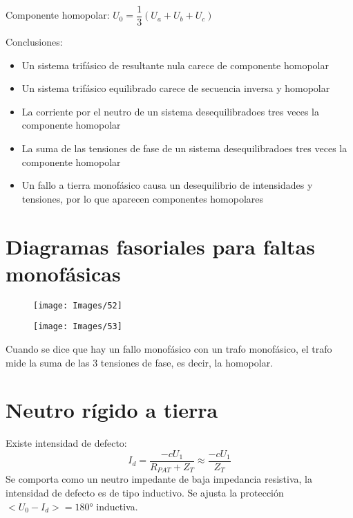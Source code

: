 Componente homopolar:
$U_0=\dfrac{1}{3}\left(U_a+U_b+U_c\right)$

Conclusiones:
\begin{itemize}
	\item Un sistema trifásico de resultante nula carece de componente homopolar
	\item Un sistema trifásico equilibrado carece de secuencia inversa y homopolar
	\item La corriente por el neutro de un sistema desequilibradoes tres veces la componente homopolar
	\item La suma de las tensiones de fase de un sistema desequilibradoes tres veces la componente homopolar
	\item Un fallo a tierra monofásico causa un desequilibrio de intensidades y tensiones, por lo que aparecen componentes homopolares
\end{itemize}
\section{Diagramas fasoriales para faltas monofásicas}
\begin{figure}[H]
	\centering
	\texttt{[image: Images/52]}
	\label{fig:52}
\end{figure}
\begin{figure}[H]
	\centering
	\texttt{[image: Images/53]}
	\label{fig:53}
\end{figure}
Cuando se dice que hay un fallo monofásico con un trafo monofásico, el trafo mide la suma de las 3 tensiones de fase, es decir, la homopolar.
\section{Neutro rígido a tierra}
Existe intensidad de defecto:
\begin{equation}
	I_d=\dfrac{-cU_1}{R_{PAT}+Z_T}\approx\dfrac{-cU_1}{Z_T}
\end{equation}
Se comporta como un neutro impedante de baja impedancia resistiva, la intensidad de defecto es de tipo inductivo. Se ajusta la protección $<U_0 - I_d> =\ang{180}$ inductiva.
\newline

